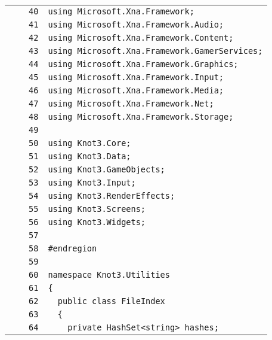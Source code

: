 \documentclass[a4paper,10pt]{article}
\begin{document}
\begin{longtable}[l]{lrrl}
\cellcolor{gray} &  & \verb~40~ & \verb~using Microsoft.Xna.Framework;~\\
\cellcolor{gray} &  & \verb~41~ & \verb~using Microsoft.Xna.Framework.Audio;~\\
\cellcolor{gray} &  & \verb~42~ & \verb~using Microsoft.Xna.Framework.Content;~\\
\cellcolor{gray} &  & \verb~43~ & \verb~using Microsoft.Xna.Framework.GamerServices;~\\
\cellcolor{gray} &  & \verb~44~ & \verb~using Microsoft.Xna.Framework.Graphics;~\\
\cellcolor{gray} &  & \verb~45~ & \verb~using Microsoft.Xna.Framework.Input;~\\
\cellcolor{gray} &  & \verb~46~ & \verb~using Microsoft.Xna.Framework.Media;~\\
\cellcolor{gray} &  & \verb~47~ & \verb~using Microsoft.Xna.Framework.Net;~\\
\cellcolor{gray} &  & \verb~48~ & \verb~using Microsoft.Xna.Framework.Storage;~\\
\cellcolor{gray} &  & \verb~49~ & \verb~~\\
\cellcolor{gray} &  & \verb~50~ & \verb~using Knot3.Core;~\\
\cellcolor{gray} &  & \verb~51~ & \verb~using Knot3.Data;~\\
\cellcolor{gray} &  & \verb~52~ & \verb~using Knot3.GameObjects;~\\
\cellcolor{gray} &  & \verb~53~ & \verb~using Knot3.Input;~\\
\cellcolor{gray} &  & \verb~54~ & \verb~using Knot3.RenderEffects;~\\
\cellcolor{gray} &  & \verb~55~ & \verb~using Knot3.Screens;~\\
\cellcolor{gray} &  & \verb~56~ & \verb~using Knot3.Widgets;~\\
\cellcolor{gray} &  & \verb~57~ & \verb~~\\
\cellcolor{gray} &  & \verb~58~ & \verb~#endregion~\\
\cellcolor{gray} &  & \verb~59~ & \verb~~\\
\cellcolor{gray} &  & \verb~60~ & \verb~namespace Knot3.Utilities~\\
\cellcolor{gray} &  & \verb~61~ & \verb~{~\\
\cellcolor{gray} &  & \verb~62~ & \verb~  public class FileIndex~\\
\cellcolor{gray} &  & \verb~63~ & \verb~  {~\\
\cellcolor{gray} &  & \verb~64~ & \verb~    private HashSet<string> hashes;~\\

\end{longtable}
\end{document}
